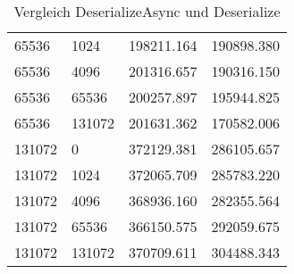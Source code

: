 \begin{table}[h]
\begin{tabular}{@{}llll@{}}
    65536               & 1024              & 198211.164                     & 190898.380                \\
    65536               & 4096              & 201316.657                     & 190316.150                \\
    65536               & 65536             & 200257.897                     & 195944.825                \\
    65536               & 131072            & 201631.362                     & 170582.006                \\
    131072              & 0                 & 372129.381                     & 286105.657                \\
    131072              & 1024              & 372065.709                     & 285783.220                \\
    131072              & 4096              & 368936.160                     & 282355.564                \\
    131072              & 65536             & 366150.575                     & 292059.675                \\
    131072              & 131072            & 370709.611                     & 304488.343                \\ \bottomrule
    \end{tabular}%
    \caption{Vergleich DeserializeAsync und Deserialize}
    \label{tab:vergleich-deserialize-async-deserialize}
\end{table}

